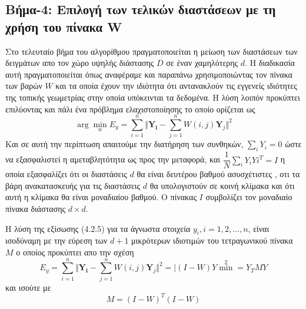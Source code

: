 \subsection{Βήμα-4: Επιλογή των τελικών διαστάσεων με τη χρήση του πίνακα \textlatin{W}}
\par
Στο τελευταίο βήμα του αλγορίθμου πραγματοποιείται η μείωση των διαστάσεων των δειγμάτων απο τον χώρο υψηλής διάστασης $D$ σε έναν χαμηλότερης $d$. Η διαδικασία αυτή πραγματοποιείται όπως αναφέραμε και παραπάνω χρησιμοποιώντας τον πίνακα των βαρών $W$ και τα οποία έχουν την ιδιότητα ότι αντανακλούν τις εγγενείς ιδιότητες της τοπικής γεωμετρίας στην οποία υπόκεινται τα δεδομένα. Η λύση λοιπόν προκύπτει επιλύοντας και πάλι ένα πρόβλημα ελαχιστοποίησης το οποίο ορίζεται ως
\newline\hspace*{\fill}
\begin{equation}
        \arg \min_{w} E_{y} = \sum_{i=1}^{n} \Vert \mathbf{Y_{i}} - \sum_{j=1}^{n} W(i,j)\mathbf{Y}_{j} \Vert ^{2}
\end{equation}
\hspace*{\fill}\newline
Και σε αυτή την περίπτωση  απαιτούμε την διατήρηση των συνθηκών, $\sum_{i} Y_{i} = 0$ ώστε να εξασφαλιστεί η αμεταβλητότητα ως προς την μεταφορά, και $ \dfrac{1}{N} \sum_{i} Y_{i}Y{i}^{T} = I $ η οποία εξασφαλίζει ότι οι διαστάσεις $d$ θα είναι δευτέρου βαθμού ασυσχέτιστες , οτι τα βάρη ανακατασκευής για τις διαστάσεις $d$ θα υπολογιστούν σε κοινή κλίμακα και ότι αυτή η κλίμακα θα είναι μοναδιαίου βαθμού. Ο πίνακας $I$ συμβολίζει τον μοναδιαίο πίνακα διάστασης $d \times d$. 
\par
Η λύση της εξίσωσης (4.2.5) για τα άγνωστα στοιχεία $y_{i},i=1,2,\ldots,n$, είναι ισοδύναμη με την εύρεση των $d+1$ μικρότερων ιδιοτιμών του τετραγωνικού πίνακα $M$ ο οποίος προκύπτει απο την σχέση
\newline\hspace*{\fill}
\begin{equation}
        E_{y} = \sum_{i=1}^{n} \Vert \mathbf{Y_{i}} - \sum_{j=1}^{n} W(i,j)\mathbf{Y}_{j} \Vert ^{2} = \mid (I-W)Y \min ^{2} = Y_{T}MY
\end{equation}
\hspace*{\fill}\newline
και ισούτε με
\begin{equation}
        M = (I-W)^{T}(I-W)
\end{equation}
\hspace*{\fill}\newline
